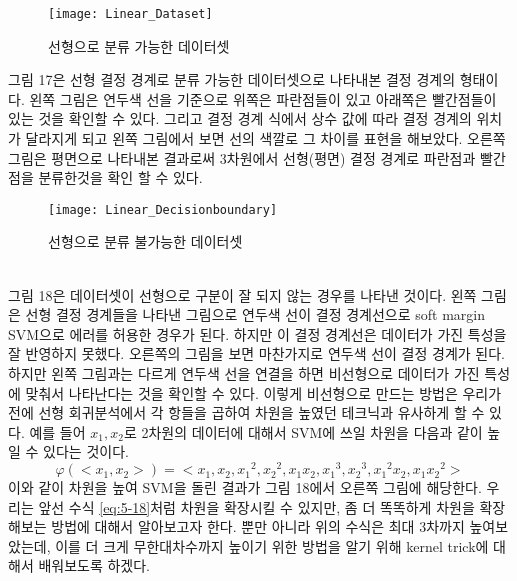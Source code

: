 \documentclass[a4paper]{oblivoir}
\begin{document}
\begin{figure}[ht]\centering
\texttt{[image: Linear\_Dataset]}\caption{선형으로 분류 가능한 데이터셋}\label{Fig:5-17}
\end{figure}
\indent 그림 17은 선형 결정 경계로 분류 가능한 데이터셋으로 나타내본 결정 경계의 형태이다. 왼쪽 그림은 연두색 선을 기준으로 위쪽은 파란점들이 있고 아래쪽은 빨간점들이 있는 것을 확인할 수 있다. 그리고 결정 경계 식에서 상수 값에 따라 결정 경계의 위치가 달라지게 되고 왼쪽 그림에서 보면 선의 색깔로 그 차이를 표현을 해보았다. 오른쪽 그림은 평면으로 나타내본 결과로써 3차원에서 선형(평면) 결정 경계로 파란점과 빨간점을 분류한것을 확인 할 수 있다.\\
\begin{figure}[ht]\centering
\texttt{[image: Linear\_Decisionboundary]}\caption{선형으로 분류 불가능한 데이터셋}\label{Fig:5-18}
\end{figure}\\
\indent 그림 18은 데이터셋이 선형으로 구분이 잘 되지 않는 경우를 나타낸 것이다. 왼쪽 그림은 선형 결정 경계들을 나타낸 그림으로 연두색 선이 결정 경계선으로 soft margin SVM으로 에러를 허용한 경우가 된다. 하지만 이 결정 경계선은 데이터가 가진 특성을 잘 반영하지 못했다. 오른쪽의 그림을 보면 마찬가지로 연두색 선이 결정 경계가 된다. 하지만 왼쪽 그림과는 다르게 연두색 선을 연결을 하면 비선형으로 데이터가 가진 특성에 맞춰서 나타난다는 것을 확인할 수 있다. 이렇게 비선형으로 만드는 방법은 우리가 전에 선형 회귀분석에서 각 항들을 곱하여 차원을 높였던 테크닉과 유사하게 할 수 있다. 예를 들어 $x_1,x_2$로 2차원의 데이터에 대해서 SVM에 쓰일 차원을 다음과 같이 높일 수 있다는 것이다.
\begin{equation}
\varphi(<x_1,x_2>)=<x_1,x_2,{x_1}^2,{x_2}^2,x_1x_2,{x_1}^3,{x_2}^3,{x_1}^2 x_2,x_1{x_2}^2>
\label{eq:5-18}
\end{equation}
\indent 이와 같이 차원을 높여 SVM을 돌린 결과가 그림 18에서 오른쪽 그림에 해당한다. 우리는 앞선 수식 \eqref{eq:5-18}처럼 차원을 확장시킬 수 있지만, 좀 더 똑똑하게 차원을 확장해보는 방법에 대해서 알아보고자 한다. 뿐만 아니라 위의 수식은 최대 3차까지 높여보았는데, 이를 더 크게 무한대차수까지 높이기 위한 방법을 알기 위해 kernel trick에 대해서 배워보도록 하겠다.
\end{document}
